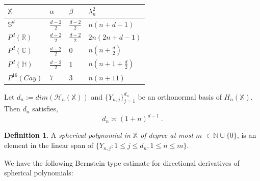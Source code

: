 \documentclass[12pt]{amsart}
\theoremstyle{definition}
\newtheorem{definition}[theorem]{Definition}
\newcommand{\R}{\mathbb R}%
\newcommand{\C}{\mathbb C}%
\newcommand{\N}{\mathbb N}%
\newcommand{\Sb}{\mathbb S}%
\newcommand{\X}{\mathbb X}%
\newcommand{\Hb}{\mathbb H}%
\numberwithin{equation}{section}
\begin{document}
\begingroup

\setlength{\tabcolsep}{10pt} %
\renewcommand{\arraystretch}{1.5} %
\begin{table}[h!]
\centering
\begin{tabular}{ ||p{1.7cm}|| p{1cm}| p{1cm}| p{2.3cm}|  }
 \hline
 $\X$ & $\alpha$ & $\beta$ & $\lambda^2_n$\\
 \hline 
$\Sb^d$   & $\frac{d-2}{2}$   & $\frac{d-2}{2}$ & $n(n+d-1)$ \\
$P^d(\R)$ & $\frac{d-2}{2}$   & $\frac{d-2}{2}$  & $2n(2n+d-1)$ \\
$P^d(\C)$ & $\frac{d-2}{2}$  & \:\:$0$  & $n\left(n+\frac{d}{2}\right)$ \\
$P^d(\Hb)$ & $\frac{d-2}{2}$ & \:\:$1$ & $n\left(n+1+\frac{d}{2}\right)$   \\
$P^{16}(Cay)$ & \:\:$7$ & \:\:$3$  & $n(n+11)$ \\
\hline
\end{tabular}
\medskip
\caption{}
\label{table:2}
\end{table}
\endgroup
\noindent Let $d_n :=dim\left(\mathscr{H}_n(\X)\right)$ and $\{Y_{n,j}\}_{j=1}^{d_n}$ be an orthonormal basis of $H_n(\X)$. Then $d_n$ satisfies, 
\begin{equation} \label{dimension_growth}
d_n \asymp \left(1+n\right)^{d-1}\:.
\end{equation}

\begin{definition} \label{defn_spherical_poly}
A {\it spherical polynomial in $\X$ of degree at most $m$} $\in \N \cup \{0\}$, is an element in the linear span of $\{Y_{n,j} : 1 \le j \le d_n, 1 \le n \le m\}$\:.
\end{definition}

We have the following Bernstein type estimate for directional derivatives of spherical polynomials:
\end{document}

